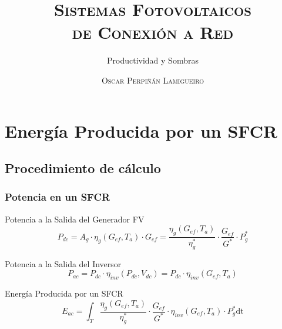 \documentclass[serif, xcolor=dvipsnames]{beamer}
\begin{document}
\title[\textsc{SFCR: Productividad y Sombras}]{\textsc{Sistemas Fotovoltaicos }\\
  \textsc{de Conexión a Red}}


\subtitle{Productividad y Sombras}


\author{\textsc{Oscar Perpiñán Lamigueiro}}
\date{}
\frame[plain]{\titlepage}



%


\section{Energía Producida por un SFCR}



\subsection{Procedimiento de cálculo}


\begin{frame}
  \frametitle{Potencia en un SFCR}
  \begin{block}{Potencia a la Salida del Generador FV}
    \begin{displaymath}
      P_{dc} = A_g \cdot \eta_g(G_{ef}, T_a) \cdot  G_{ef} = %
      \frac{\eta_g(G_{ef}, T_a)}{\eta_g^*} \cdot \frac{G_{ef}}{G^*} \cdot P_g^* 
    \end{displaymath}
  \end{block}

  \begin{block}{Potencia a la Salida del Inversor}
    \begin{displaymath}
      P_{ac} = P_{dc} \cdot \eta_{inv}(P_{dc}, V_{dc}) =  P_{dc} \cdot \eta_{inv}(G_{ef}, T_a)
    \end{displaymath}
  \end{block}

  \begin{block}{Energía Producida por un SFCR}
    \begin{displaymath}
      E_{ac} = \int_T \frac{\eta_g(G_{ef}, T_a)}{\eta_g^*} \cdot
      \frac{G_{ef}}{G^*} \cdot \eta_{inv}(G_{ef}, T_a) \cdot P_g^* \mathrm{dt} 
    \end{displaymath}
  \end{block}

\end{frame}
\end{document}
